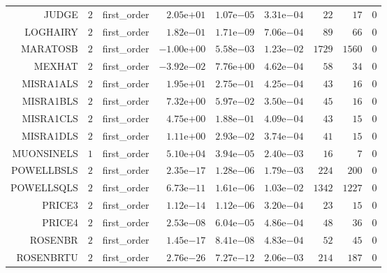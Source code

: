 \begin{longtable}{rrrrrrrrr}
JUDGE & \(     2\) & first\_order & \( 2.05\)e\(+01\) & \( 1.07\)e\(-05\) & \( 3.31\)e\(-04\) & \(    22\) & \(    17\) & \(     0\) \\
LOGHAIRY & \(     2\) & first\_order & \( 1.82\)e\(-01\) & \( 1.71\)e\(-09\) & \( 7.06\)e\(-04\) & \(    89\) & \(    66\) & \(     0\) \\
MARATOSB & \(     2\) & first\_order & \(-1.00\)e\(+00\) & \( 5.58\)e\(-03\) & \( 1.23\)e\(-02\) & \(  1729\) & \(  1560\) & \(     0\) \\
MEXHAT & \(     2\) & first\_order & \(-3.92\)e\(-02\) & \( 7.76\)e\(+00\) & \( 4.62\)e\(-04\) & \(    58\) & \(    34\) & \(     0\) \\
MISRA1ALS & \(     2\) & first\_order & \( 1.95\)e\(+01\) & \( 2.75\)e\(-01\) & \( 4.25\)e\(-04\) & \(    43\) & \(    16\) & \(     0\) \\
MISRA1BLS & \(     2\) & first\_order & \( 7.32\)e\(+00\) & \( 5.97\)e\(-02\) & \( 3.50\)e\(-04\) & \(    45\) & \(    16\) & \(     0\) \\
MISRA1CLS & \(     2\) & first\_order & \( 4.75\)e\(+00\) & \( 1.88\)e\(-01\) & \( 4.09\)e\(-04\) & \(    43\) & \(    15\) & \(     0\) \\
MISRA1DLS & \(     2\) & first\_order & \( 1.11\)e\(+00\) & \( 2.93\)e\(-02\) & \( 3.74\)e\(-04\) & \(    41\) & \(    15\) & \(     0\) \\
MUONSINELS & \(     1\) & first\_order & \( 5.10\)e\(+04\) & \( 3.94\)e\(-05\) & \( 2.40\)e\(-03\) & \(    16\) & \(     7\) & \(     0\) \\
POWELLBSLS & \(     2\) & first\_order & \( 2.35\)e\(-17\) & \( 1.28\)e\(-06\) & \( 1.79\)e\(-03\) & \(   224\) & \(   200\) & \(     0\) \\
POWELLSQLS & \(     2\) & first\_order & \( 6.73\)e\(-11\) & \( 1.61\)e\(-06\) & \( 1.03\)e\(-02\) & \(  1342\) & \(  1227\) & \(     0\) \\
PRICE3 & \(     2\) & first\_order & \( 1.12\)e\(-14\) & \( 1.12\)e\(-06\) & \( 3.20\)e\(-04\) & \(    23\) & \(    15\) & \(     0\) \\
PRICE4 & \(     2\) & first\_order & \( 2.53\)e\(-08\) & \( 6.04\)e\(-05\) & \( 4.86\)e\(-04\) & \(    48\) & \(    36\) & \(     0\) \\
ROSENBR & \(     2\) & first\_order & \( 1.45\)e\(-17\) & \( 8.41\)e\(-08\) & \( 4.83\)e\(-04\) & \(    52\) & \(    45\) & \(     0\) \\
ROSENBRTU & \(     2\) & first\_order & \( 2.76\)e\(-26\) & \( 7.27\)e\(-12\) & \( 2.06\)e\(-03\) & \(   214\) & \(   187\) & \(     0\) \\

\end{longtable}
